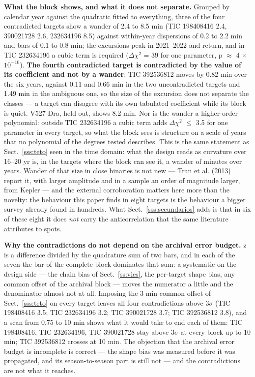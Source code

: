 \documentclass{aa}
\begin{document}
\textbf{What the block shows, and what it does not separate.} Grouped by calendar year against the quadratic fitted to everything, three of the four contradicted targets show a wander of 2.4 to 8.5 min (TIC 198408416 2.4, 390021728 2.6, 232634196 8.5) against within-year dispersions of 0.2 to 2.2 min and bars of 0.1 to 0.8 min; the excursions peak in 2021--2022 and return, and in TIC 232634196 a cubic term is required ($\Delta\chi^2$ = 39 for one parameter, p $\approx$ 4 $\times$ $10^{-10}$). \textbf{The fourth contradicted target is contradicted by the value of its coefficient and not by a wander}: TIC 392536812 moves by 0.82 min over the six years, against 0.11 and 0.66 min in the two uncontradicted targets and 1.49 min in the ambiguous one, so the size of the excursion does not separate the classes --- a target can disagree with its own tabulated coefficient while its block is quiet. V527 Dra, held out, shows 8.2 min. Nor is the wander a higher-order polynomial: outside TIC 232634196 a cubic term adds $\Delta\chi^2$ $\le$ 3.5 for one parameter in every target, so what the block sees is structure on a scale of years that no polynomial of the degrees tested describes. This is the same statement as Sect.~\ref{sss:teto} seen in the time domain: what the design reads as curvature over 16--20 yr is, in the targets where the block can see it, a wander of minutes over years. Wander of that size in close binaries is not new --- Tran et al. (2013) report it, with larger amplitude and in a sample an order of magnitude larger, from Kepler --- and the external corroboration matters here more than the novelty: the behaviour this paper finds in eight targets is the behaviour a bigger survey already found in hundreds. What Sect.~\ref{sss:secundarios} adds is that in six of these eight it does \textit{not} carry the anticorrelation that the same literature attributes to spots.

\textbf{Why the contradictions do not depend on the archival error budget.} z is a difference divided by the quadrature sum of two bars, and in each of the seven the bar of the complete block dominates that sum: a systematic on the design side --- the chain bias of Sect.~\ref{ss:vies}, the per-target shape bias, any common offset of the archival block --- moves the numerator a little and the denominator almost not at all. Imposing the 3 min common offset of Sect.~\ref{sss:teto} on every target leaves all four contradictions above 3$\sigma$ (TIC 198408416 3.5; TIC 232634196 3.2; TIC 390021728 3.7; TIC 392536812 3.8), and a scan from 0.75 to 10 min shows what it would take to end each of them: TIC 198408416, TIC 232634196, TIC 390021728 stay above 3$\sigma$ at every block up to 10 min; TIC 392536812 crosses at 10 min. The objection that the archival error budget is incomplete is correct --- the shape bias was measured before it was propagated, and its season-to-season part is still not --- and the contradictions are not what it reaches.
\end{document}
